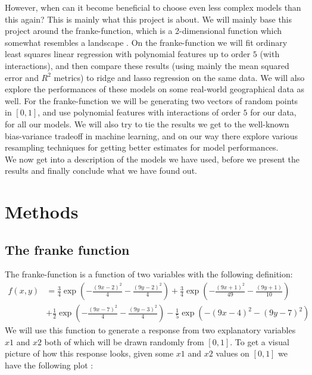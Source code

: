 \documentclass{article}
\begin{document}
However, when can it become beneficial to choose even less complex models than
this again? This is mainly what this project is about. We will mainly base this
project around the franke-function, which is a 2-dimensional function which
somewhat resembles a landscape \cite{franke2ddesc}. On the franke-function we
will fit ordinary least squares linear regression with polynomial features up to
order $5$ (with interactions), and then compare these results (using mainly the
mean squared error and $R^2$ metrics) to ridge and lasso regression on the
same data. We will also explore the performances of these models on some
real-world geographical data as well. For the franke-function we will be
generating two vectors of random points in $\left[ 0, 1 \right]$, and use
polynomial features with interactions of order $5$ for our data, for all our
models. We will also try to tie the results we get to the well-known
bias-variance tradeoff in machine learning, and on our way there explore various
resampling techniques for getting better estimates for model performances.
\\

We now get into a description of the models we have used, before we present the
results and finally conclude what we have found out.

\section{Methods}
\subsection{The franke function}
The franke-function is a function of two variables with the following definition:
\begin{align*}
    f(x,y) & = \frac{3}{4}\exp{\left(-\frac{(9x-2)^2}{4} - \frac{(9y-2)^2}{4}\right)}+\frac{3}{4}\exp{\left(-\frac{(9x+1)^2}{49}- \frac{(9y+1)}{10}\right)} \\
           & +\frac{1}{2}\exp{\left(-\frac{(9x-7)^2}{4} - \frac{(9y-3)^2}{4}\right)} -\frac{1}{5}\exp{\left(-(9x-4)^2 - (9y-7)^2\right) }
\end{align*}
We will use this function to generate a response from two explanatory variables
$x1$ and $x2$ both of which will be drawn randomly from $\left[ 0, 1 \right]$.
To get a visual picture of how this response looks, given some $x1$ and $x2$
values on $\left[ 0, 1 \right]$ we have the following plot \cite[figures,
    frankefunction.png]{githubrepoproject1}:
\end{document}
